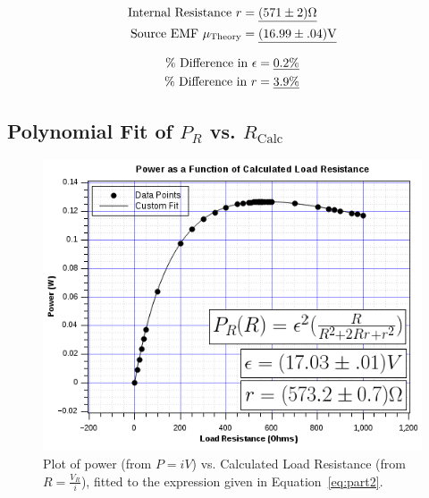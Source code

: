 \documentclass[twocolumn,english]{IEEEtran}
\theoremstyle{plain}
\theoremstyle{plain}
\begin{document}
  \begin{align*}
   \text{Internal Resistance $r$} 		&=\text{\underline{$(571 \pm 2)\Omega$}}	\\
   \text{Source EMF }\mu_{\text{Theory}}	&=\text{\underline{$(16.99 \pm .04)$V}}
  \end{align*}

  \begin{align*}
   \text{\% Difference in }\epsilon 	&=\text{\underline{0.2\%}}	\\
   \text{\% Difference in }r		&=\text{\underline{3.9\%}}
  \end{align*}

  \subsection{\textbf{Polynomial Fit of $P_R$ vs. $R_{\text{Calc}}$}}

  \begin{figure}[htpb]
  \begin{centering}
  \begin{center}
  \includegraphics[width=\linewidth]{./Images/power_graph.png}
  \caption{Plot of power (from $P=iV$) vs. Calculated Load Resistance (from $R=\frac{V_R}{i}$), fitted to the expression given in Equation~\ref{eq:part2}.}
  \label{fig:power_graph}
  \end{center}
  \par\end{centering}
  \end{figure}
\end{document}
